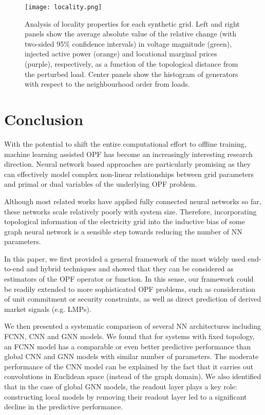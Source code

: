 \documentclass[journal]{IEEEtran}
\begin{document}
\begin{figure*}
    \centerline{\texttt{[image: locality.png]}}
    \caption{Analysis of locality properties for each synthetic grid. Left and right panels show the average absolute value of the relative change (with two-sided 95\% confidence intervals) in voltage magnitude (green), injected active power (orange) and locational marginal prices (purple), respectively, as a function of the topological distance from the perturbed load. Center panels show the histogram of generators with respect to the neighbourhood order from loads.}
    \label{fig:locality}
\end{figure*}

\section{Conclusion}
With the potential to shift the entire computational effort to offline training, machine learning assisted OPF has become an increasingly interesting research direction.
Neural network based approaches are particularly promising as they can effectively model complex non-linear relationships between grid parameters and primal or dual variables of the underlying OPF problem.

Although most related works have applied fully connected neural networks so far, these networks scale relatively poorly with system size.
Therefore, incorporating topological information of the electricity grid into the inductive bias of some graph neural network is a sensible step towards reducing the number of NN parameters.

In this paper, we first provided a general framework of the most widely used end-to-end and hybrid techniques and showed that they can be considered as estimators of the OPF operator or function. In this sense, our framework could be readily extended to more sophisticated OPF problems, such as consideration of unit commitment or security constraints, as well as direct prediction of derived market signals (e.g. LMPs).

We then presented a systematic comparison of several NN architectures including FCNN, CNN and GNN models.
We found that for systems with fixed topology, an FCNN model has a comparable or even better predictive performance than global CNN and GNN models with similar number of parameters.
The moderate performance of the CNN model can be explained by the fact that it carries out convolutions in Euclidean space (instead of the graph domain).
We also identified that in the case of global GNN models, the readout layer plays a key role: constructing local models by removing their readout layer led to a significant decline in the predictive performance.
\end{document}
